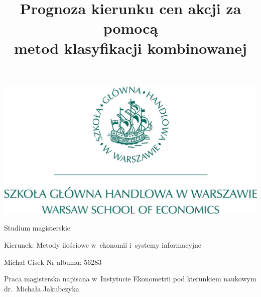 \documentclass[12pt,a4paper,twoside,openany]{book}
\begin{document}
\begin{center}
\includegraphics[scale=0.3]{logo.JPG}

\vspace{1cm}

Studium magisterskie
\end{center}

\vspace{1cm}

\noindent Kierunek: Metody ilościowe w~ekonomii i~systemy informacyjne


\vspace{1cm}

{
\leftskip=10cm\noindent
Michał Cisek\newline
Nr albumu: 56283

}

\vspace{2cm}

\title{Prognoza kierunku cen akcji za pomocą \\metod klasyfikacji kombinowanej}

\makeatletter

\begin{center}
\LARGE\bf
\@title
\end{center}

\vspace{2cm}

{
\leftskip=10cm\noindent
Praca magisterska\newline 
napisana w~Instytucie Ekonometrii\newline
pod kierunkiem naukowym\newline
dr.~Michała Jakubczyka

}

\vfill
\end{document}
